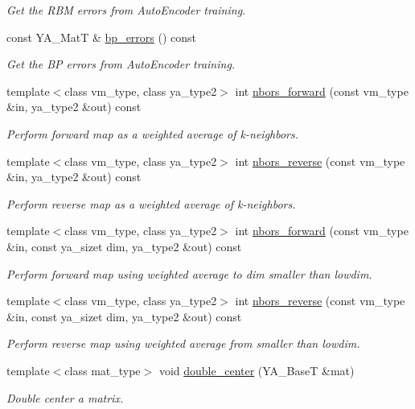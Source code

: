 \begin{CompactItemize}
\begin{CompactList}\small\item\em Get the RBM errors from Auto\-Encoder training. \item\end{CompactList}\item 
\hypertarget{class_y_a_dim_reduce_a31}{
const YA\_\-Mat\-T \& \hyperlink{class_y_a_dim_reduce_a31}{bp\_\-errors} () const }
\label{class_y_a_dim_reduce_a31}

\begin{CompactList}\small\item\em Get the BP errors from Auto\-Encoder training. \item\end{CompactList}\item 
template$<$class vm\_\-type, class ya\_\-type2$>$ int \hyperlink{class_y_a_dim_reduce_a32}{nbors\_\-forward} (const vm\_\-type \&in, ya\_\-type2 \&out) const 
\begin{CompactList}\small\item\em Perform forward map as a weighted average of k-neighbors. \item\end{CompactList}\item 
template$<$class vm\_\-type, class ya\_\-type2$>$ int \hyperlink{class_y_a_dim_reduce_a33}{nbors\_\-reverse} (const vm\_\-type \&in, ya\_\-type2 \&out) const 
\begin{CompactList}\small\item\em Perform reverse map as a weighted average of k-neighbors. \item\end{CompactList}\item 
template$<$class vm\_\-type, class ya\_\-type2$>$ int \hyperlink{class_y_a_dim_reduce_a34}{nbors\_\-forward} (const vm\_\-type \&in, const ya\_\-sizet dim, ya\_\-type2 \&out) const 
\begin{CompactList}\small\item\em Perform forward map using weighted average to dim smaller than lowdim. \item\end{CompactList}\item 
template$<$class vm\_\-type, class ya\_\-type2$>$ int \hyperlink{class_y_a_dim_reduce_a35}{nbors\_\-reverse} (const vm\_\-type \&in, const ya\_\-sizet dim, ya\_\-type2 \&out) const 
\begin{CompactList}\small\item\em Perform reverse map using weighted average from smaller than lowdim. \item\end{CompactList}\item 
template$<$class mat\_\-type$>$ void \hyperlink{class_y_a_dim_reduce_a36}{double\_\-center} (YA\_\-Base\-T \&mat)
\begin{CompactList}\small\item\em Double center a matrix. \item\end{CompactList}\end{CompactItemize}
